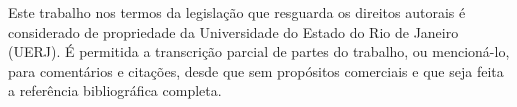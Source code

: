 {	\noindent
	Este trabalho nos termos da legislação que resguarda os direitos autorais é considerado de propriedade da Universidade do Estado do Rio de Janeiro (UERJ). É permitida a transcrição parcial de partes do trabalho, ou mencioná-lo, para comentários e citações, desde que sem propósitos comerciais e que seja feita a referência bibliográfica completa.
	
	\begin{flushright}
		\assinatura{\imprimirautor}
	\end{flushright}
}

\imprimircatalogacao